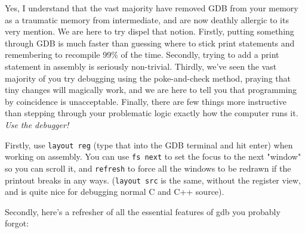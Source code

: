\documentclass[11pt]{article}
\begin{document}
Yes, I understand that the vast majority have removed GDB from your memory as a traumatic
memory from intermediate, and are now deathly allergic to its very mention. We are here to
try dispel that notion. Firstly, putting something through GDB is much faster than
guessing where to stick print statements and remembering to recompile 99\% of the time.
Secondly, trying to add a print statement in assembly is seriously non-trivial. Thirdly,
we've seen the vast majority of you try debugging using the poke-and-check method, praying
that tiny changes will magically work, and we are here to tell you that programming by
coincidence is unacceptable. Finally, there are few things more instructive than stepping
through your problematic logic exactly how the computer runs it. \emph{Use the debugger!}

Firstly, use \texttt{layout reg} (type that into the GDB terminal and hit enter) when
working on assembly. You can use \texttt{fs next} to set the focus to the next "window" so
you can scroll it, and \texttt{refresh} to force all the windows to be redrawn if the
printout breaks in any ways. (\texttt{layout src} is the same, without the register view,
and is quite nice for debugging normal C and C++ source).

Secondly, here's a refresher of all the essential features of gdb you probably forgot:
\end{document}
